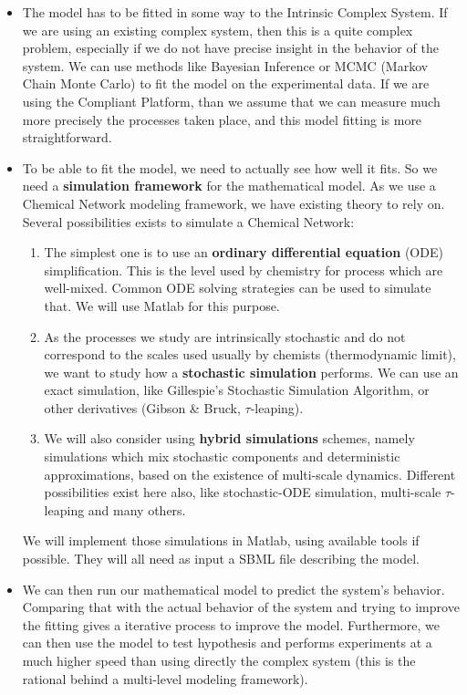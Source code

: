 \documentclass[letterpaper, oneside]{article}
\begin{document}
\begin{itemize}
	\item The model has to be fitted in some way to the Intrinsic Complex System. If we are using an existing complex system, then this is a quite complex problem, especially if we do not have precise insight in the behavior of the system. We can use methods like Bayesian Inference or MCMC (Markov Chain Monte Carlo) to fit the model on the experimental data. If we are using the Compliant Platform, than we assume that we can measure much more precisely the processes taken place, and this model fitting is more straightforward.
	\item To be able to fit the model, we need to actually see how well it fits. So we need a \textbf{simulation framework} for the mathematical model. As we use a Chemical Network modeling framework, we have existing theory to rely on. Several possibilities exists to simulate a Chemical Network:
	\begin{enumerate}
		\item The simplest one is to use an \textbf{ordinary differential equation} (ODE) simplification. This is the level used by chemistry for process which are well-mixed. Common ODE solving strategies can be used to simulate that. We will use Matlab for this purpose.
		\item As the processes we study are intrinsically stochastic and do not correspond to the scales used usually by chemists (thermodynamic limit), we want to study how a \textbf{stochastic simulation }performs. We can use an exact simulation, like Gillespie's Stochastic Simulation Algorithm, or other derivatives (Gibson \& Bruck, $\tau$-leaping).
		\item We will also consider using \textbf{hybrid simulations} schemes, namely simulations which mix stochastic components and deterministic approximations, based on the existence of multi-scale dynamics. Different possibilities exist here also, like stochastic-ODE simulation, multi-scale $\tau$-leaping and many others.
	\end{enumerate} 
	We will implement those simulations in Matlab, using available tools if possible. They will all need as input a SBML file describing the model.
	
	\item We can then run our mathematical model to predict the system's behavior. Comparing that with the actual behavior of the system and trying to improve the fitting gives a iterative process to improve the model. Furthermore, we can then use the model to test hypothesis and performs experiments at a much higher speed than using directly the complex system (this is the rational behind a multi-level modeling framework).
\end{itemize}
\end{document}
